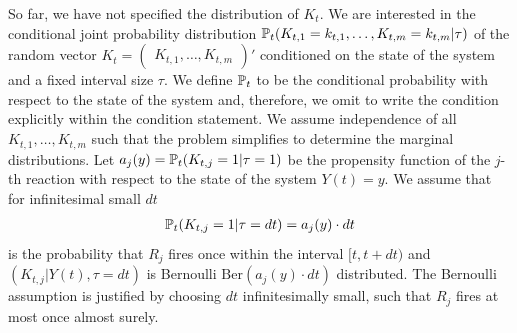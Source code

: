 So far, we have not specified the distribution of $K_t$. We are interested in the conditional joint probability distribution $\mathbb{P}_t(K_{t,1} = k_{t,1}, \dots, K_{t,m} = k_{t,m}|\tau)$ of the random vector $K_t = \begin{pmatrix}
K_{t,1}, \dots, K_{t,m} \end{pmatrix}'$ conditioned on the state of the system and a fixed interval size $\tau$. We define $\mathbb{P}_t$ to be the conditional probability with respect to the state of the system and, therefore, we omit to write the condition explicitly within the condition statement. We assume independence of all $K_{t, 1},\hdots, K_{t, m}$ such that the problem simplifies to determine the marginal distributions. Let $a_j(y) = \mathbb{P}_t(K_{t,j}=1|\tau=1)$ be the propensity function of the $j$-th reaction with respect to the state of the system $Y(t)=y$. We assume that for infinitesimal small $dt$
\begin{align}
\mathbb{P}_t(K_{t,j} = 1|\tau = dt) = a_j(y) \cdot dt
\end{align}
is the probability that $R_j$ fires once within the interval $[t, t+dt)$ and $\left(K_{t,j}|Y(t), \tau =dt \right)$ is Bernoulli $\mathrm{Ber}(a_j(y) \cdot dt)$ distributed. The Bernoulli assumption is justified by choosing $dt$ infinitesimally small, such that $R_j$ fires at most once almost surely.

